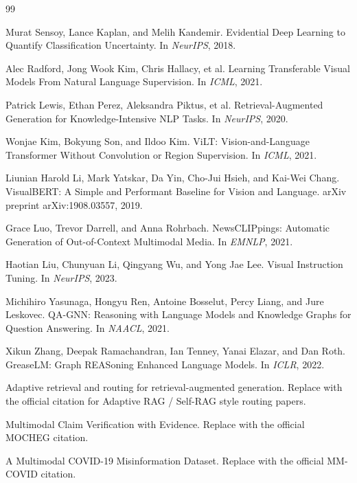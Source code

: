 \documentclass[11pt,a4paper]{article}
\begin{document}
\begin{thebibliography}{99}

Murat Sensoy, Lance Kaplan, and Melih Kandemir.
\newblock Evidential Deep Learning to Quantify Classification Uncertainty.
\newblock In \textit{NeurIPS}, 2018.

Alec Radford, Jong Wook Kim, Chris Hallacy, et al.
\newblock Learning Transferable Visual Models From Natural Language Supervision.
\newblock In \textit{ICML}, 2021.

Patrick Lewis, Ethan Perez, Aleksandra Piktus, et al.
\newblock Retrieval-Augmented Generation for Knowledge-Intensive NLP Tasks.
\newblock In \textit{NeurIPS}, 2020.

Wonjae Kim, Bokyung Son, and Ildoo Kim.
\newblock ViLT: Vision-and-Language Transformer Without Convolution or Region Supervision.
\newblock In \textit{ICML}, 2021.

Liunian Harold Li, Mark Yatskar, Da Yin, Cho-Jui Hsieh, and Kai-Wei Chang.
\newblock VisualBERT: A Simple and Performant Baseline for Vision and Language.
\newblock arXiv preprint arXiv:1908.03557, 2019.

Grace Luo, Trevor Darrell, and Anna Rohrbach.
\newblock NewsCLIPpings: Automatic Generation of Out-of-Context Multimodal Media.
\newblock In \textit{EMNLP}, 2021.

Haotian Liu, Chunyuan Li, Qingyang Wu, and Yong Jae Lee.
\newblock Visual Instruction Tuning.
\newblock In \textit{NeurIPS}, 2023.

Michihiro Yasunaga, Hongyu Ren, Antoine Bosselut, Percy Liang, and Jure Leskovec.
\newblock QA-GNN: Reasoning with Language Models and Knowledge Graphs for Question Answering.
\newblock In \textit{NAACL}, 2021.

Xikun Zhang, Deepak Ramachandran, Ian Tenney, Yanai Elazar, and Dan Roth.
\newblock GreaseLM: Graph REASoning Enhanced Language Models.
\newblock In \textit{ICLR}, 2022.

Adaptive retrieval and routing for retrieval-augmented generation.
\newblock Replace with the official citation for Adaptive RAG / Self-RAG style routing papers.

Multimodal Claim Verification with Evidence.
\newblock Replace with the official MOCHEG citation.

A Multimodal COVID-19 Misinformation Dataset.
\newblock Replace with the official MM-COVID citation.


\end{thebibliography}
\end{document}
